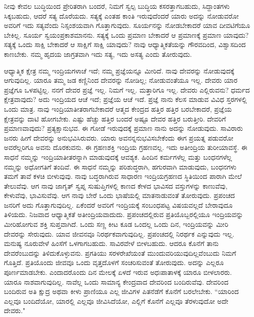 ನೀವು ಕೇವಲ ಬುದ್ಧಿಯಿಂದ ಪ್ರೇರಿತರಾಗಿ ಬಂದರೆ, ನಿಮಗೆ ಸ್ವಲ್ಪ ಬುದ್ಧಿಯ ಕಸರತ್ತಾಗಬಹುದು, ಸಿದ್ದಾಂತಗಳು ಸಿಕ್ಕಬಹುದು, ಆದರೆ ಸತ್ಯ ದೊರೆಯದು. ಸತ್ಯಕ್ಕೆ ಎಂತಹ ಕಾಂತಿ ಇರುವುದೆಂದರೆ ಯಾರು ಅದನ್ನು ನೋಡುವರೋ ಅವರಿಗೆ ಇದು ಸತ್ಯವೆಂದು ನಿಸ್ಸಂಶಯವಾಗಿ ಗೊತ್ತಾಗುವುದು. ಸೂರ್ಯನನ್ನು ನೋಡಬೇಕಾದರೆ ಯಾವ ದೀವಟಿಗೆಯೂ ಬೇಕಿಲ್ಲ. ಸೂರ್ಯ ಸ್ವಯಂಪ್ರಕಾಶಮಾನನು. ಸತ್ಯಕ್ಕೆ ಒಂದು ಪ್ರಮಾಣ ಬೇಕಾದರೆ ಆ ಪ್ರಮಾಣಕ್ಕೆ ಪ್ರಮಾಣ ಯಾವುದು? ಸತ್ಯಕ್ಕೆ ಒಂದು ಸಾಕ್ಷಿ ಬೇಕಾದರೆ ಆ ಸಾಕ್ಷಿಗೆ ಸಾಕ್ಷಿ ಯಾವುದು? ನಾವು ಆಧ್ಯಾತ್ಮಿಕತೆಯನ್ನು ಗೌರವದಿಂದ, ವಿಶ್ವಾಸದಿಂದ ಕಾಣಬೇಕು. ನಮ್ಮ ಹೃದಯ ಜಾಗ್ರತವಾಗಿ ಇದು ಸತ್ಯ, ಇದು ಅಸತ್ಯ ಎಂದು ತೋರುವುದು.

ಆಧ್ಯಾತ್ಮಿಕ ಕ್ಷೇತ್ರ ನಮ್ಮ ಇಂದ್ರಿಯಗಳಾಚೆ ಇದೆ; ನಮ್ಮ ಪ್ರಜ್ಞೆಯನ್ನೂ ಮೀರಿದೆ. ನಾವು ದೇವರನ್ನು ನೋಡುವುದಕ್ಕೆ ಆಗುವುದಿಲ್ಲ. ಯಾರೂ ತಮ್ಮ ಜಡ ಕಣ್ಣಿನಿಂದ ದೇವರನ್ನು ನೋಡಿಲ್ಲ; ನೋಡುವಂತೆಯೂ ಇಲ್ಲ. ದೇವರು ಯಾರ ಪ್ರಜ್ಞೆಗೂ ಒಳಪಟ್ಟಿಲ್ಲ. ನನಗೆ ದೇವರ ಪ್ರಜ್ಞೆ ಇಲ್ಲ. ನಿಮಗೆ ಇಲ್ಲ. ಮತ್ತಾರಿಗೂ ಇಲ್ಲ. ದೇವರು ಎಲ್ಲಿರುವನು? ಧರ್ಮದ ಕ್ಷೇತ್ರವಾವುದು? ಅದು ಇಂದ್ರಿಯದ ಆಚೆ ಇದೆ; ಪ್ರಜ್ಞೆಯ ಆಚೆ ಇದೆ. ಪ್ರಜ್ಞೆ ನಾನು ಕೆಲಸ ಮಾಡುವ ವಿವಿಧ ಸ್ತರಗಳಲ್ಲಿ ಒಂದು ಮಾತ್ರ. ನಾವು ಇಂದ್ರಿಯಾತೀತರಾಗಬೇಕಾದರೆ ಆತ್ಮದ ಕೇಂದ್ರದ ಹತ್ತಿರ ಹತ್ತಿರ ಬರಬೇಕಾದರೆ, ಪ್ರಜ್ಞೆಯ ಕ್ಷೇತ್ರವನ್ನು ದಾಟಿ ಹೋಗಬೇಕು. ಎಷ್ಟು ಹೆಚ್ಚು ಹತ್ತಿರ ಬಂದರೆ ಅಷ್ಟೂ ದೇವರ ಹತ್ತಿರ ಬರುತ್ತೀರಿ. ದೇವರಿಗೆ ಪ್ರಮಾಣವಾವುದು? ಪ್ರತ್ಯಕ್ಷಾನುಭವ. ಈ ಗೋಡೆ ಇರುವುದಕ್ಕೆ ಪ್ರಮಾಣ ನಾನು ಅದನ್ನು ನೋಡುವುದು. ಸಾವಿರಾರು ಜನರು ಹೀಗೆ ದೇವರನ್ನು ಅನುಭವಿಸಿರುವರು. ಯಾರು ಅವನನ್ನನುಭವಿಸಬೇಕೆಂದು ಈಗ ಪ್ರಯತ್ನ ಪಡುವರೋ ಅವರೆಲ್ಲರಿಗೂ ಅವನು ದೊರಕುವನು. ಈ ಗ್ರಹಣಶಕ್ತಿ ಇಂದ್ರಿಯ ಗ್ರಹಣವಲ್ಲ. ಇದು ಅತೀಂದ್ರಿಯ ತುರೀಯಾವಸ್ಥೆ. ಈ ಸಾಧನೆ ನಮ್ಮನ್ನು ಇಂದ್ರಿಯಾತೀತರನ್ನಾಗಿ ಮಾಡುವುದಕ್ಕೆ ಆವಶ್ಯಕ. ಹಿಂದಿನ ಕರ್ಮಗಳೆಲ್ಲ ಮತ್ತು ಬಂಧನಗಳೆಲ್ಲ ನಮ್ಮನ್ನು ಅಧೋಗತಿಗೆ ತಂದಿವೆ. ಈ ಸಾಧನೆ ನಮ್ಮನ್ನು ಪರಿಶುದ್ಧರಾಗಿ, ಹಗುರವಾಗಿ ಮಾಡುವುದು, ಬಂಧನಗಳು ತಮಗೆ ತಾವೆ ಕಳಚಿ ಬೀಳುವುವು. ನಾವು ಬದ್ಧರಾಗಿರುವ ಸಾಧಾರಣ ಇಂದ್ರಿಯಗ್ರಹಣದ ಸ್ಥಿತಿಯಿಂದ ಪಾರಾಗಿ ಮೇಲೆ ತೇಲುವೆವು. ಆಗ ನಾವು ಜಾಗೃತ್ ಸ್ವಪ್ನ ಸುಷುಪ್ತಿಗಳಲ್ಲಿ ಕಾಣದ ಕೇಳದ ಭಾವಿಸದ ವಸ್ತುಗಳನ್ನು ಕಾಣುವೆವು, ಕೇಳುವೆವು, ಭಾವಿಸುವೆವು. ಆಗ ನಾವು ಬೇರೆ ಒಂದು ಭಾಷೆಯಲ್ಲಿ ಮಾತನಾಡುವಂತೆ ತೋರುವುದು. ಪ್ರಪಂಚದ ಜನರಿಗೆ ಅದು ಗೊತ್ತಾಗುವುದಿಲ್ಲ. ಏಕೆಂದರೆ ಅವರಿಗೆ ಇಂದ್ರಿಯಕ್ಕೆ ಸಂಬಂಧಪಟ್ಟ ವಿಷಯವಲ್ಲದೆ ಬೇರಾವುದೂ ತಿಳಿಯದು. ನಿಜವಾದ ಆಧ್ಯಾತ್ಮಿಕತೆ ಅತೀಂದ್ರಿಯವಾದುದು. ಪ್ರಪಂಚದಲ್ಲಿರುವ ಪ್ರತಿಯೊಬ್ಬರಲ್ಲಿಯೂ ಇಂದ್ರಿಯವನ್ನು ಮೀರಿಹೋಗುವ ಶಕ್ತಿ ಸುಪ್ತವಾಗಿದೆ. ಒಂದು ಸಣ್ಣ ಕೀಟ ಕೂಡ ಒಂದಲ್ಲ ಒಂದು ದಿನ, ಇಂದ್ರಿಯವನ್ನು ಮೀರಿ ದೇವರನ್ನು ಸೇರುವುದು. ಯಾವ ಜೀವನವೂ ನಿರರ್ಥಕವಾಗುವುದಿಲ್ಲ. ಪ್ರಪಂಚದಲ್ಲಿ ನಿರರ್ಥಕ ಎನ್ನುವುದು ಇಲ್ಲ. ಮನುಷ್ಯ ನೂರುವೇಳೆ ಹಿಂಸೆಗೆ ಒಳಗಾಗಬಹುದು. ಸಾವಿರವೇಳೆ ಬೀಳಬಹುದು. ಆದರೂ ಕೊನೆಗೆ ತಾನು ದೇವರೆಂಬುದನ್ನು ತಿಳಿದುಕೊಳ್ಳುವನು. ಪ್ರಗತಿಯು ಸರಳರೇಖೆಯಂತೆ ಮುಂದುವರಿಯುವುದಿಲ್ಲವೆಂಬುದು ನಿಮಗೆ ಗೊತ್ತಿದೆ. ಪ್ರತಿಯೊಂದು ಜೀವವೂ ಒಂದು ವೃತ್ತದೊಳಗೆ ಸಂಚರಿಸುವಂತೆ ತೋರುವುದು. ಅದನ್ನು ಎಲ್ಲರೂ ಪೂರ್ಣಮಾಡಬೇಕು. ಎಂದಾದರೊಂದು ದಿನ ಮೇಲಕ್ಕೆ ಏಳದೆ ಇರುವ ಅಧಃಪಾತಾಳಕ್ಕೆ ಯಾರೂ ಬೀಳಲಾರರು. ಯಾರೂ ನಾಶವಾಗುವುದಿಲ್ಲ. ನಾವೆಲ್ಲ ಒಂದು ಸಾಮಾನ್ಯ ಕೇಂದ್ರವಾದ ದೇವರಿಂದ ಬಂದಿರುವೆವು. ದೇವರಿಂದ ಬಂದಿರುವ ಅತಿ ಕ್ಷುದ್ರ ಅಥವಾ ಕೀಳು ಪ್ರಾಣಿಯೂ ಎಲ್ಲ ಜೀವಿಗಳ ಪಿತನೆಡೆಗೆ ಕೊನೆಗೆ ಬರಲೇಬೇಕು. “ಯಾರಿಂದ ಎಲ್ಲವೂ ಬಂದಿದೆಯೋ, ಯಾರಲ್ಲಿ ಎಲ್ಲವೂ ಜೀವಿಸಿದೆಯೋ, ಎಲ್ಲಿಗೆ ಕೊನೆಗೆ ಎಲ್ಲವೂ ತೆರಳುವುದೋ ಅದೇ ದೇವರು."


